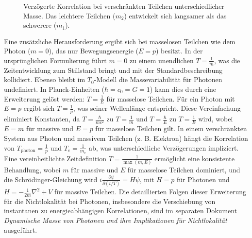 \documentclass[a4paper,12pt]{article}
\begin{document}
	\begin{figure}[h]
		\centering
		\caption{Verzögerte Korrelation bei verschränkten Teilchen unterschiedlicher Masse. Das leichtere Teilchen ($m_2$) entwickelt sich langsamer als das schwerere ($m_1$).}
	\end{figure}
	
	Eine zusätzliche Herausforderung ergibt sich bei masselosen Teilchen wie dem Photon (\( m = 0 \)), das nur Bewegungsenergie (\( E = p \)) besitzt. In der ursprünglichen Formulierung führt \( m = 0 \) zu einem unendlichen \( T = \frac{1}{m} \), was die Zeitentwicklung zum Stillstand bringt und mit der Standardbeschreibung kollidiert. Ebenso bleibt im \( T_0 \)-Modell die Massevariabilität für Photonen undefiniert. In Planck-Einheiten (\( \hbar = c_0 = G = 1 \)) kann dies durch eine Erweiterung gelöst werden: \( T = \frac{1}{E} \) für masselose Teilchen. Für ein Photon mit \( E = p \) ergibt sich \( T = \frac{1}{p} \), was seiner Wellenlänge entspricht. Diese Vereinfachung eliminiert Konstanten, da \( T = \frac{\hbar}{m c^2} \) zu \( T = \frac{1}{m} \) und \( T = \frac{\hbar}{E} \) zu \( T = \frac{1}{E} \) wird, wobei \( E = m \) für massive und \( E = p \) für masselose Teilchen gilt. In einem verschränkten System aus Photon und massivem Teilchen (z. B. Elektron) hängt die Korrelation von \( T_\text{photon} = \frac{1}{p} \) und \( T_e = \frac{1}{m_e} \) ab, was unterschiedliche Verzögerungen impliziert. Eine vereinheitlichte Zeitdefinition \( T = \frac{1}{\max(m, E)} \) ermöglicht eine konsistente Behandlung, wobei \( m \) für massive und \( E \) für masselose Teilchen dominiert, und die Schrödinger-Gleichung wird \( i \frac{\partial \psi}{\partial (t/T)} = H \psi \), mit \( H = p \) für Photonen und \( H = -\frac{1}{2m} \nabla^2 + V \) für massive Teilchen. Die detaillierten Folgen dieser Erweiterung für die Nichtlokalität bei Photonen, insbesondere die Verschiebung von instantanen zu energieabhängigen Korrelationen, sind im separaten Dokument \textit{Dynamische Masse von Photonen und ihre Implikationen für Nichtlokalität} ausgeführt.
	
\end{document}
